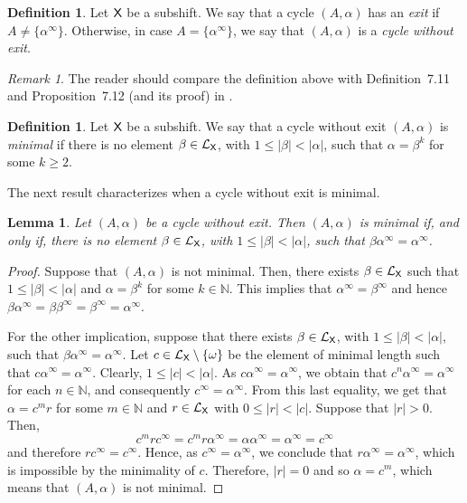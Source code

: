 \documentclass[a4paper,12pt]{amsart}
\newtheorem{lemma}[equation]{Lemma}
\theoremstyle{definition}
\newtheorem{definition}[equation]{Definition}
\theoremstyle{remark}
\newtheorem{remark}[equation]{Remark}
\numberwithin{equation}{section}
\newcommand{\osf}{{\normalfont \textsf{X}}}
\newcommand{\lang}{\CL_{\osf}}
\newcommand{\N}{\mathbb{N}}
\newcommand{\CL}{\mathcal{L}}
\begin{document}
\begin{definition}\label{cyclexit}
Let $\osf$ be a subshift. We say that a cycle $(A,\alpha)$ has an \emph{exit} if $A\neq \{\alpha^\infty\}$. Otherwise, in case $A=\{\alpha^\infty\}$, we say that $(A,\alpha)$ is a \emph{cycle without exit}.
\end{definition}

\begin{remark}
   The reader should compare the definition above with Definition~7.11 and Proposition~7.12 (and its proof) in  \cite{GillesDanie}.
\end{remark}

\begin{definition}\label{mini}
Let $\osf$ be a subshift. We say that a cycle without exit $(A,\alpha)$ is \emph{minimal} if there is no element $\beta\in \lang$, with $1\leq |\beta|<|\alpha|$, such that $\alpha=\beta^k$ for some $k\geq 2$.
\end{definition}

The next result characterizes when a cycle without exit is minimal.

\begin{lemma}\label{minimalversion01} Let $(A,\alpha)$ be a cycle without exit. Then $(A,\alpha)$ is minimal if, and only if, there is no element $
\beta \in \lang$, with $1\leq |\beta|<|\alpha|$, such that $\beta \alpha^\infty=\alpha^\infty$.
\end{lemma}

\begin{proof} Suppose that $(A,\alpha)$ is not minimal. Then, there exists $\beta\in \lang$ such that $1\leq |\beta|<|\alpha|$ and $\alpha=\beta^k$ for some $k\in \N$. This implies that $\alpha^\infty=\beta^\infty$ and hence $\beta \alpha^\infty=\beta \beta^\infty=\beta^\infty=\alpha^\infty$.

For the other implication, suppose that there exists $\beta\in \lang$, with $1\leq |\beta|<|\alpha|$, such that $\beta \alpha^\infty=\alpha^\infty$.  Let $c\in \lang \setminus\{\omega\}$ be the element of minimal length such that $c\alpha^\infty=\alpha^\infty$. Clearly, $1\leq |c|<|\alpha|$. As $c\alpha^\infty=\alpha^\infty$, we obtain that $c^n \alpha^\infty=\alpha^\infty$ for each $n\in \N$, and consequently $c^\infty=\alpha^\infty$. From this last equality, we get that $\alpha=c^mr$ for some $m\in \N$ and $r\in \lang$ with $0\leq |r|<|c|$. Suppose that $|r|>0$. Then, 
$$c^mr c^\infty=c^mr \alpha^\infty=\alpha\alpha^\infty=\alpha^\infty=c^\infty$$ and therefore $rc^\infty=c^\infty$. Hence, as $c^\infty=\alpha^\infty$,  we conclude that $r\alpha^\infty=\alpha^\infty$, which is impossible by the minimality of $c$. Therefore, $|r|=0$ and so $\alpha=c^m$, which means that $(A,\alpha)$ is not minimal.  
\end{proof}
\end{document}
